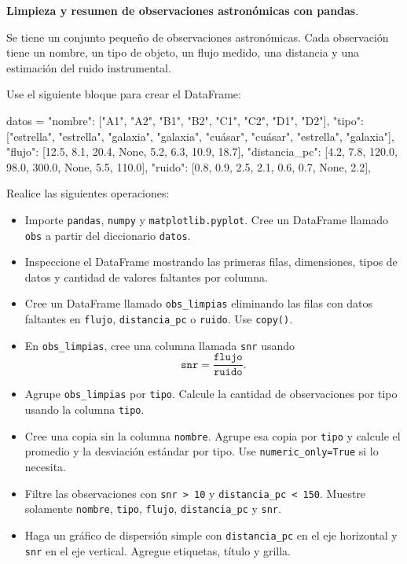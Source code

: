 \providecommand{\Needspace}[1]{}
\Needspace{8\baselineskip}
\item \textbf{Limpieza y resumen de observaciones astronómicas con pandas}.
\nopagebreak[4]

\begin{tcolorbox}[colback=blue!2!white,colframe=blue!55!black,title={Enunciado},
                  before skip=3pt,after skip=5pt,boxsep=3pt,top=3pt,bottom=3pt,
                  breakable]
\small
\raggedright
Se tiene un conjunto pequeño de observaciones astronómicas. Cada observación
tiene un nombre, un tipo de objeto, un flujo medido, una distancia y una
estimación del ruido instrumental.

Use el siguiente bloque para crear el DataFrame:

\begin{pythonjupyter}
datos = {
    "nombre": ["A1", "A2", "B1", "B2", "C1", "C2", "D1", "D2"],
    "tipo": ["estrella", "estrella", "galaxia", "galaxia",
             "cuásar", "cuásar", "estrella", "galaxia"],
    "flujo": [12.5, 8.1, 20.4, None, 5.2, 6.3, 10.9, 18.7],
    "distancia_pc": [4.2, 7.8, 120.0, 98.0, 300.0, None, 5.5, 110.0],
    "ruido": [0.8, 0.9, 2.5, 2.1, 0.6, 0.7, None, 2.2],
}
\end{pythonjupyter}

Realice las siguientes operaciones:

\begin{itemize}
\setlength{\topsep}{4pt}
\setlength{\itemsep}{3pt}
\setlength{\parsep}{0pt}
\item[(a)] Importe \texttt{pandas}, \texttt{numpy} y
\texttt{matplotlib.pyplot}. Cree un DataFrame llamado \texttt{obs} a partir del
diccionario \texttt{datos}.
\item[(b)] Inspeccione el DataFrame mostrando las primeras filas, dimensiones,
tipos de datos y cantidad de valores faltantes por columna.
\item[(c)] Cree un DataFrame llamado \texttt{obs\_limpias} eliminando las filas
con datos faltantes en \texttt{flujo}, \texttt{distancia\_pc} o \texttt{ruido}.
Use \texttt{copy()}.
\item[(d)] En \texttt{obs\_limpias}, cree una columna llamada \texttt{snr} usando
\[
\texttt{snr}=\frac{\texttt{flujo}}{\texttt{ruido}}.
\]
\item[(e)] Agrupe \texttt{obs\_limpias} por \texttt{tipo}. Calcule la cantidad
de observaciones por tipo usando la columna \texttt{tipo}.
\item[(f)] Cree una copia sin la columna \texttt{nombre}. Agrupe esa copia por
\texttt{tipo} y calcule el promedio y la desviación estándar por tipo. Use
\texttt{numeric\_only=True} si lo necesita.
\item[(g)] Filtre las observaciones con \texttt{snr > 10} y
\texttt{distancia\_pc < 150}. Muestre solamente \texttt{nombre}, \texttt{tipo},
\texttt{flujo}, \texttt{distancia\_pc} y \texttt{snr}.
\item[(h)] Haga un gráfico de dispersión simple con \texttt{distancia\_pc} en el
eje horizontal y \texttt{snr} en el eje vertical. Agregue etiquetas, título y
grilla.
\end{itemize}
\end{tcolorbox}

